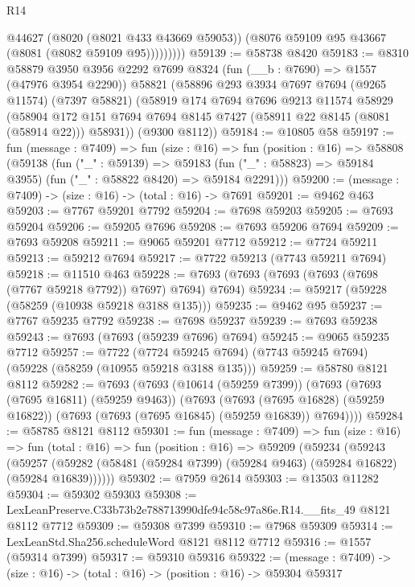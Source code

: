 \begin{lexlean}{R14}
\begin{coremodule}
                @44627
                (@8020 (@8021 @433 @43669 @59053))
                (@8076 @59109 @95 @43667 (@8081 (@8082 @59109 @95)))))))))
@59139 := @58738 @8420
@59183 := @8310
    @58879
    @3950
    @3956
    @2292
    @7699
    @8324
    (fun (__b : @7690) => @1557 (@47976 @3954 @2290))
    @58821
    (@58896
      @293
      @3934
      @7697
      @7694
      (@9265 @11574)
      (@7397 @58821)
      (@58919
        @174
        @7694
        @7696
        @9213
        @11574
        @58929
        (@58904 @172 @151 @7694 @7694 @8145 @7427 (@58911 @22 @8145 (@8081 (@58914 @22))) @58931))
      (@9300 @8112))
@59184 := @10805 @58
@59197 := fun (message : @7409) =>
  fun (size : @16) =>
  fun (position : @16) =>
  @58808
    (@59138
      (fun ("_" : @59139) =>
      @59183 (fun ("_" : @58823) => @59184 @3955) (fun ("_" : @58822 @8420) => @59184 @2291)))
@59200 := (message : @7409) -> (size : @16) -> (total : @16) -> @7691
@59201 := @9462 @463
@59203 := @7767 @59201 @7792
@59204 := @7698 @59203
@59205 := @7693 @59204
@59206 := @59205 @7696
@59208 := @7693 @59206 @7694
@59209 := @7693 @59208
@59211 := @9065 @59201 @7712
@59212 := @7724 @59211
@59213 := @59212 @7694
@59217 := @7722 @59213 (@7743 @59211 @7694)
@59218 := @11510 @463
@59228 := @7693 (@7693 (@7693 (@7693 (@7698 (@7767 @59218 @7792)) @7697) @7694) @7694)
@59234 := @59217 (@59228 (@58259 (@10938 @59218 @3188 @135)))
@59235 := @9462 @95
@59237 := @7767 @59235 @7792
@59238 := @7698 @59237
@59239 := @7693 @59238
@59243 := @7693 (@7693 (@59239 @7696) @7694)
@59245 := @9065 @59235 @7712
@59257 := @7722
    (@7724 @59245 @7694)
    (@7743 @59245 @7694)
    (@59228 (@58259 (@10955 @59218 @3188 @135)))
@59259 := @58780 @8121 @8112
@59282 := @7693
    (@7693
      (@10614 (@59259 @7399))
      (@7693
        (@7693 (@7695 @16811) (@59259 @9463))
        (@7693
          (@7693 (@7695 @16828) (@59259 @16822))
          (@7693 (@7693 (@7695 @16845) (@59259 @16839)) @7694))))
@59284 := @58785 @8121 @8112
@59301 := fun (message : @7409) =>
  fun (size : @16) =>
  fun (total : @16) =>
  fun (position : @16) =>
  @59209
    (@59234
      (@59243
        (@59257 (@59282 (@58481 (@59284 @7399) (@59284 @9463) (@59284 @16822) (@59284 @16839))))))
@59302 := @7959 @2614
@59303 := @13503 @11282
@59304 := @59302 @59303
@59308 := LexLeanPreserve.C33b73b2e788713990dfe94c58c97a86e.R14.__fits_49 @8121 @8112 @7712
@59309 := @59308 @7399
@59310 := @7968 @59309
@59314 := LexLeanStd.Sha256.scheduleWord @8121 @8112 @7712
@59316 := @1557 (@59314 @7399)
@59317 := @59310 @59316
@59322 := (message : @7409) -> (size : @16) -> (total : @16) -> (position : @16) -> @59304 @59317

\end{coremodule}
\end{lexlean}
